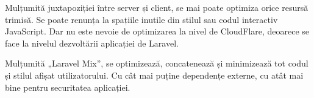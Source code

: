 		Mulțumită juxtapoziției între server și client, se mai poate optimiza orice resursă trimisă.
		Se poate renunța la spațiile inutile din stilul sau codul interactiv JavaScript.
		Dar nu este nevoie de optimizarea la nivel de CloudFlare, deoarece se face la nivelul dezvoltării aplicației de Laravel.

		Mulțumită „Laravel Mix”, se optimizează, concatenează și minimizează tot codul și stilul afișat utilizatorului.
		Cu cât mai puține dependențe externe, cu atât mai bine pentru securitatea aplicației.
